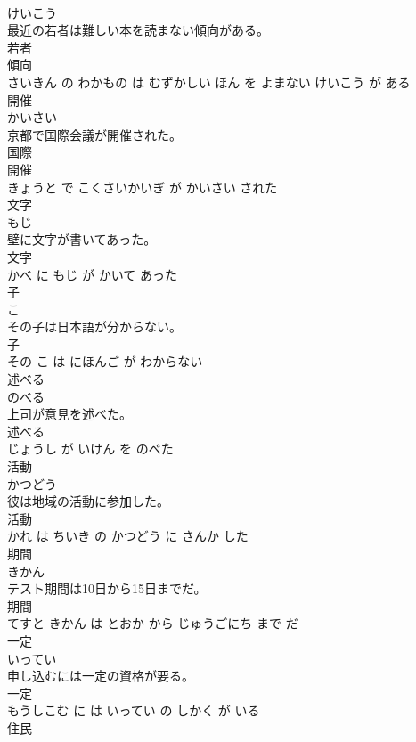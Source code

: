 \documentclass[8pt]{extreport}
\begin{document}
\begin{CJK}{UTF8}{min}
\\	けいこう			
\\	最近の若者は難しい本を読まない傾向がある。	
\\	若者 
\\	傾向 
\\	さいきん の わかもの は むずかしい ほん を よまない けいこう が ある			
\\	開催	
\\	かいさい			
\\	京都で国際会議が開催された。	
\\	国際 
\\	開催 
\\	きょうと で こくさいかいぎ が かいさい された			
\\	文字	
\\	もじ			
\\	壁に文字が書いてあった。	
\\	文字 
\\	かべ に もじ が かいて あった			
\\	子	
\\	こ			
\\	その子は日本語が分からない。	
\\	子 
\\	その こ は にほんご が わからない			
\\	述べる	
\\	のべる			
\\	上司が意見を述べた。	
\\	述べる 
\\	じょうし が いけん を のべた			
\\	活動	
\\	かつどう			
\\	彼は地域の活動に参加した。	
\\	活動 
\\	かれ は ちいき の かつどう に さんか した			
\\	期間	
\\	きかん			
\\	テスト期間は10日から15日までだ。	
\\	期間 
\\	てすと きかん は とおか から じゅうごにち まで だ			
\\	一定	
\\	いってい			
\\	申し込むには一定の資格が要る。	
\\	一定 
\\	もうしこむ に は いってい の しかく が いる			
\\	住民	

\end{CJK}
\end{document}
